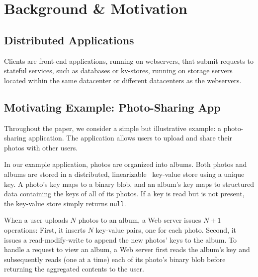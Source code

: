 \section{Background \& Motivation}

\subsection{Distributed Applications}

Clients are front-end applications, running on webservers, that submit requests to stateful services, such as databases or kv-stores, running on storage servers located within the same datacenter or different datacenters as the webservers.

\subsection{Motivating Example: Photo-Sharing App}

Throughout the paper, we consider a simple but illustrative
example: a photo-sharing application. The application allows
users to upload and share their photos with other users.

In our example application, photos are organized into
albums. Both photos and albums are stored in a distributed,
linearizable~\cite{herlihy1990linearizability} key-value store
using a unique key. A photo's key maps to a binary blob, and
an album's key maps to structured data containing the keys of
all of its photos. If a key is read but is not present, the
key-value store simply returns \texttt{null}.

When a user uploads $N$ photos to an album, a Web server
issues $N+1$ operations: First, it inserts $N$ key-value
pairs, one for each photo. Second, it issues a read-modify-write
to append the new photos' keys to the album. To handle a request to
view an album, a Web server first reads the album's key and subsequently
reads (one at a time) each of its photo's binary blob before
returning the aggregated contents to the user.



